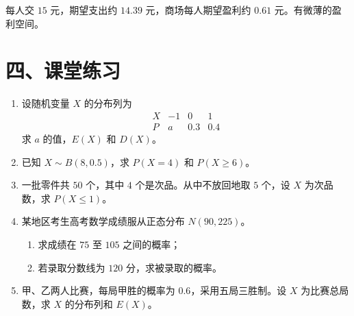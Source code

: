 \documentclass[12pt, a4paper]{ctexart}
\begin{document}
每人交 $15$ 元，期望支出约 $14.39$ 元，商场每人期望盈利约 $0.61$ 元。有微薄的盈利空间。

\section*{\textcolor{tipgreen}{四、课堂练习}}

\begin{enumerate}
  \item 设随机变量 $X$ 的分布列为
  \[
  \begin{array}{c|ccc}
  X & -1 & 0 & 1 \\
  \hline
  P & a & 0.3 & 0.4
  \end{array}
  \]
  求 $a$ 的值，$E(X)$ 和 $D(X)$。

  \item 已知 $X \sim B(8, 0.5)$，求 $P(X = 4)$ 和 $P(X \geqslant 6)$。

  \item 一批零件共 $50$ 个，其中 $4$ 个是次品。从中不放回地取 $5$ 个，设 $X$ 为次品数，求 $P(X \leqslant 1)$。

  \item 某地区考生高考数学成绩服从正态分布 $N(90, 225)$。
  \begin{enumerate}[label=(\arabic*)]
    \item 求成绩在 $75$ 至 $105$ 之间的概率；
    \item 若录取分数线为 $120$ 分，求被录取的概率。
  \end{enumerate}

  \item 甲、乙两人比赛，每局甲胜的概率为 $0.6$，采用五局三胜制。设 $X$ 为比赛总局数，求 $X$ 的分布列和 $E(X)$。
\end{enumerate}
\end{document}
